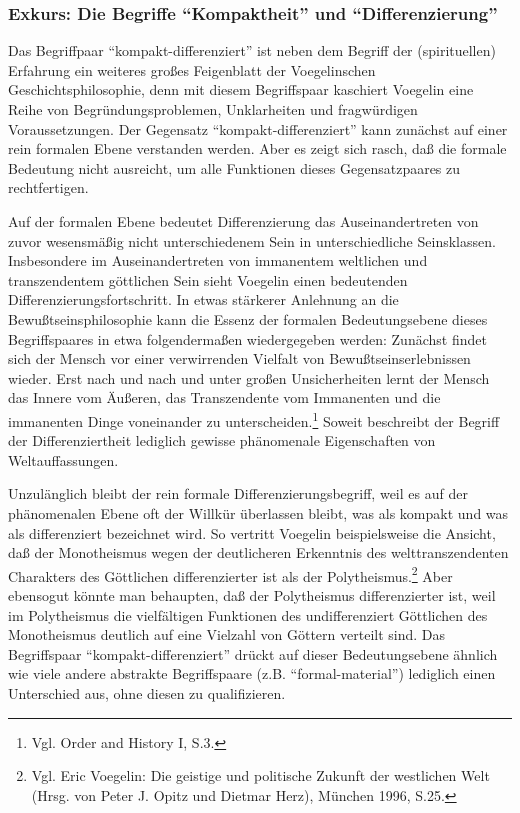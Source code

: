 \subsubsection{Exkurs: Die Begriffe "`Kompaktheit"' und "`Differenzierung"'}

Das Begriffpaar "`kompakt-differenziert"' ist neben dem Begriff der
(spirituellen) Erfahrung ein weiteres großes Feigenblatt der Voegelinschen
Geschichtsphilosophie, denn mit diesem Begriffspaar kaschiert Voegelin eine
Reihe von Begründungsproblemen, Unklarheiten und fragwürdigen Voraussetzungen.
Der Gegensatz "`kompakt-differenziert"' kann zunächst auf einer rein formalen
Ebene verstanden werden. Aber es zeigt sich rasch, daß die formale Bedeutung
nicht ausreicht, um alle Funktionen dieses Gegensatzpaares zu rechtfertigen.

Auf der formalen Ebene bedeutet Differenzierung das Auseinandertreten von
zuvor wesensmäßig nicht unterschiedenem Sein in unterschiedliche Seinsklassen.
Insbesondere im Auseinandertreten von immanentem weltlichen und transzendentem
göttlichen Sein sieht Voegelin einen bedeutenden Differenzierungsfortschritt.
In etwas stärkerer Anlehnung an die Bewußtseinsphilosophie kann die
Essenz der formalen Bedeutungsebene dieses Begriffspaares in etwa
folgendermaßen wiedergegeben werden: Zunächst findet sich der Mensch vor einer
verwirrenden Vielfalt von Bewußtseinserlebnissen wieder. Erst nach und nach
und unter großen Unsicherheiten lernt der Mensch das Innere vom Äußeren, das
Transzendente vom Immanenten und die immanenten Dinge voneinander zu
unterscheiden.\footnote{Vgl. Order and History I, S.3.} Soweit beschreibt der
Begriff der Differenziertheit lediglich gewisse phänomenale Eigenschaften von
Weltauf\/fassungen.

Unzulänglich bleibt der rein formale Differenzierungsbegriff, weil es auf der
phänomenalen Ebene oft der Willkür überlassen bleibt, was als kompakt und was
als differenziert bezeichnet wird. So vertritt Voegelin beispielsweise die
Ansicht, daß der Monotheismus wegen der deutlicheren Erkenntnis des
welttranszendenten Charakters des Göttlichen differenzierter ist als der
Polytheismus.\footnote{Vgl. Eric Voegelin: Die geistige und politische Zukunft
  der westlichen Welt (Hrsg. von Peter J. Opitz und Dietmar Herz), München
  1996, S.25.} Aber ebensogut könnte man behaupten, daß der Polytheismus
differenzierter ist, weil im Polytheismus die vielfältigen Funktionen des
undifferenziert Göttlichen des Monotheismus deutlich auf eine Vielzahl von
Göttern verteilt sind. Das Begriffspaar "`kompakt-differenziert"' drückt auf
dieser Bedeutungsebene ähnlich wie viele andere abstrakte Begriffspaare (z.B.
"`formal-material"') lediglich einen Unterschied aus, ohne diesen zu
qualifizieren.

